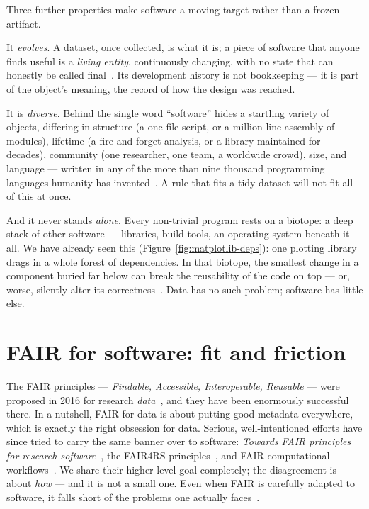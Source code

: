 Three further properties make software a moving target rather than a frozen artifact.

It \emph{evolves}. A dataset, once collected, is what it is; a piece of software that anyone
finds useful is a \emph{living entity}, continuously changing, with no state that can honestly be
called final~\autocite{NatureSD2026}. Its development history is not bookkeeping --- it is part
of the object's meaning, the record of how the design was reached.

It is \emph{diverse}. Behind the single word \enquote{software} hides a startling variety of
objects, differing in structure (a one-file script, or a million-line assembly of modules),
lifetime (a fire-and-forget analysis, or a library maintained for decades), community (one
researcher, one team, a worldwide crowd), size, and language --- written in any of the more than nine
thousand programming languages humanity has invented~\autocite{NatureSD2026}. A rule that fits a
tidy dataset will not fit all of this at once.

And it never stands \emph{alone}. Every non-trivial program rests on a biotope: a deep stack of
other software --- libraries, build tools, an operating system beneath it all. We have already
seen this (Figure~\ref{fig:matplotlib-deps}): one plotting library drags in a whole forest of
dependencies. In that biotope, the smallest change in a component buried far below can break the
reusability of the code on top --- or, worse, silently alter its
correctness~\autocite{NatureSD2026}. Data has no such problem; software has little else.

\section{FAIR for software: fit and friction}

The FAIR principles --- \emph{Findable, Accessible, Interoperable, Reusable} --- were proposed in
2016 for research \emph{data}~\autocite{fairdefinition2016}, and they have been enormously
successful there. In a nutshell, FAIR-for-data is about putting good metadata everywhere, which
is exactly the right obsession for data. Serious, well-intentioned efforts have since tried to
carry the same banner over to software: \emph{Towards FAIR principles for research
software}~\autocite{Lamprecht2020}, the FAIR4RS principles~\autocite{barker2022fair4rs}, and FAIR
computational workflows~\autocite{Goble2020}. We share their higher-level goal completely; the
disagreement is about \emph{how} --- and it is not a small one. Even when FAIR is carefully
adapted to software, it falls short of the problems one actually faces~\autocite{NatureSD2026}.

